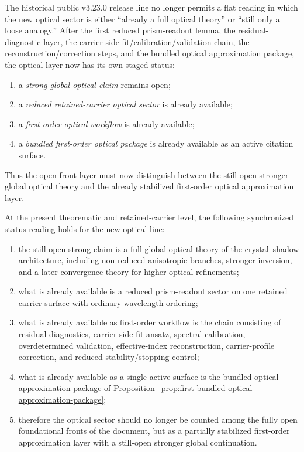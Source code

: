 \begin{remark}
\label{rem:v323-synchronized-status-reading-for-the-optical-approximation-layer}
The historical public v3.23.0 release line no longer permits a flat reading in which the new optical sector is either ``already a full optical theory'' or ``still only a loose analogy.'' After the first reduced prism-readout lemma, the residual-diagnostic layer, the carrier-side fit/calibration/validation chain, the reconstruction/correction steps, and the bundled optical approximation package, the optical layer now has its own staged status:
\begin{enumerate}[leftmargin=2em,label=(\roman*)]
  \item a \emph{strong global optical claim} remains open;
  \item a \emph{reduced retained-carrier optical sector} is already available;
  \item a \emph{first-order optical workflow} is already available;
  \item a \emph{bundled first-order optical package} is already available as an active citation surface.
\end{enumerate}
Thus the open-front layer must now distinguish between the still-open stronger global optical theory and the already stabilized first-order optical approximation layer.
\end{remark}

\begin{proposition}
\label{prop:v323-optical-open-question-status-synchronization-principle}
At the present theorematic and retained-carrier level, the following synchronized status reading holds for the new optical line:
\begin{enumerate}[leftmargin=2em,label=(\roman*)]
  \item the still-open strong claim is a full global optical theory of the crystal--shadow architecture, including non-reduced anisotropic branches, stronger inversion, and a later convergence theory for higher optical refinements;
  \item what is already available is a reduced prism-readout sector on one retained carrier surface with ordinary wavelength ordering;
  \item what is already available as first-order workflow is the chain consisting of residual diagnostics, carrier-side fit ansatz, spectral calibration, overdetermined validation, effective-index reconstruction, carrier-profile correction, and reduced stability/stopping control;
  \item what is already available as a single active surface is the bundled optical approximation package of Proposition~\ref{prop:first-bundled-optical-approximation-package};
  \item therefore the optical sector should no longer be counted among the fully open foundational fronts of the document, but as a partially stabilized first-order approximation layer with a still-open stronger global continuation.
\end{enumerate}
\end{proposition}

